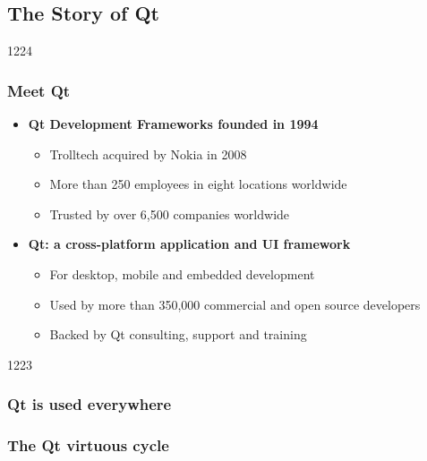 \subsection{The Story of Qt}

\begin{slide}{1224}
  \frametitle{Meet Qt}
  \begin{itemize}
  \item \textbf{Qt Development Frameworks founded in 1994}
    \begin{itemize}
   \item Trolltech acquired by Nokia in 2008
    \item More than 250 employees in eight locations worldwide
    \item Trusted by over 6,500 companies worldwide
    \end{itemize}
  \item \textbf{Qt: a cross-platform application and UI framework}
    \begin{itemize}
    \item For desktop, mobile and embedded development
    \item Used by more than 350,000 commercial and open source developers
    \item Backed by Qt consulting, support and training
    \end{itemize}
 \end{itemize}
 \vfill
\end{slide}

\begin{slide}{1223}
  \frametitle{Qt is used everywhere}
  \hspace*{0.025\pdfpagewidth}
\end{slide}

\begin{slide}
  \frametitle{The Qt virtuous cycle}
   \\
  \medskip
\end{slide}

